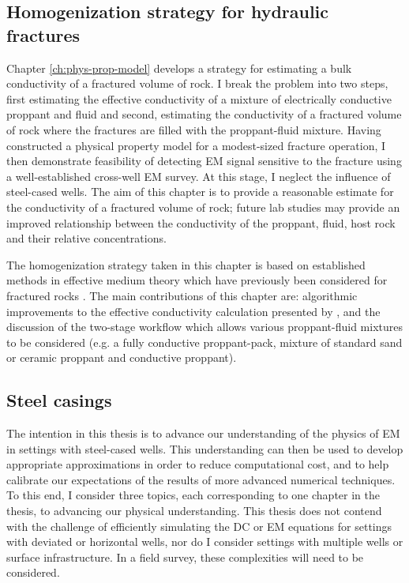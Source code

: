 \subsection{Homogenization strategy for hydraulic fractures}

Chapter \ref{ch:phys-prop-model} develops a strategy for estimating a bulk conductivity of a fractured volume of rock.  I break the problem into two steps, first estimating the effective conductivity of a mixture of electrically conductive proppant and fluid and second, estimating the conductivity of a fractured volume of rock where the fractures are filled with the proppant-fluid mixture. Having constructed a physical property model for a modest-sized fracture operation, I then demonstrate feasibility of detecting EM signal sensitive to the fracture using a well-established cross-well EM survey. At this stage, I neglect the influence of steel-cased wells. The aim of this chapter is to provide a reasonable estimate for the conductivity of a fractured volume of rock; future lab studies may provide an improved relationship between the conductivity of the proppant, fluid, host rock and their relative concentrations.

The homogenization strategy taken in this chapter is based on established methods in effective medium theory \citep{Bruggeman1935} which have previously been considered for fractured rocks \citep{Berryman2013}. The main contributions of this chapter are: algorithmic improvements to the effective conductivity calculation presented by \cite{Berryman2013}, and the discussion of the two-stage workflow which allows various proppant-fluid mixtures to be considered (e.g. a fully conductive proppant-pack, mixture of standard sand or ceramic proppant and conductive proppant).


\subsection{Steel casings}

The intention in this thesis is to advance our understanding of the physics of EM in settings with steel-cased wells. This understanding can then be used to develop appropriate approximations in order to reduce computational cost, and to help calibrate our expectations of the results of more advanced numerical techniques. To this end, I consider three topics, each corresponding to one chapter in the thesis, to advancing our physical understanding. This thesis does not contend with the challenge of efficiently simulating the DC or EM equations for settings with deviated or horizontal wells, nor do I consider settings with multiple wells or surface infrastructure. In a field survey, these complexities will need to be considered.

